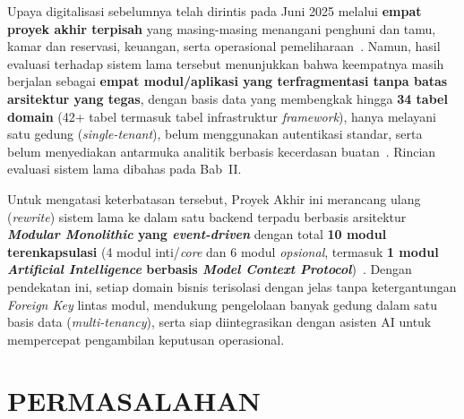 Upaya digitalisasi sebelumnya telah dirintis pada Juni 2025 melalui \textbf{empat proyek akhir terpisah} yang masing-masing menangani penghuni dan tamu, kamar dan reservasi, keuangan, serta operasional pemeliharaan~\cite{rasyidatur2025,roihanah2025,rizal2025,bagus2025}. Namun, hasil evaluasi terhadap sistem lama tersebut menunjukkan bahwa keempatnya masih berjalan sebagai \textbf{empat modul/aplikasi yang terfragmentasi tanpa batas arsitektur yang tegas}, dengan basis data yang membengkak hingga \textbf{34 tabel domain} (42+ tabel termasuk tabel infrastruktur \textit{framework}), hanya melayani satu gedung (\textit{single-tenant}), belum menggunakan autentikasi standar, serta belum menyediakan antarmuka analitik berbasis kecerdasan buatan~\cite{alqoran2025,sakimura2014}. Rincian evaluasi sistem lama dibahas pada Bab~II.

Untuk mengatasi keterbatasan tersebut, Proyek Akhir ini merancang ulang (\textit{rewrite}) sistem lama ke dalam satu backend terpadu berbasis arsitektur \textbf{\textit{Modular Monolithic} yang \textit{event-driven}} dengan total \textbf{10 modul terenkapsulasi} (4 modul inti/\textit{core} dan 6 modul \textit{opsional}, termasuk \textbf{1 modul \textit{Artificial Intelligence} berbasis \textit{Model Context Protocol}})~\cite{tjahjanto2025,ayyubi2024,alqoran2025}. Dengan pendekatan ini, setiap domain bisnis terisolasi dengan jelas tanpa ketergantungan \textit{Foreign Key} lintas modul, mendukung pengelolaan banyak gedung dalam satu basis data (\textit{multi-tenancy}), serta siap diintegrasikan dengan asisten AI untuk mempercepat pengambilan keputusan operasional.

\section{PERMASALAHAN}

